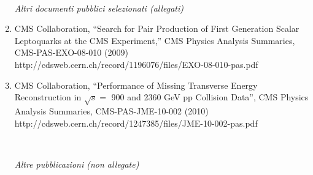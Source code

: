 \documentclass[10pt]{letter}
\begin{document}
\begin{enumerate}
~\\
\begin{center} \textit{Altri documenti pubblici selezionati (allegati)} \\ \end{center}

\item CMS Collaboration, 
  ``Search for Pair Production of First Generation Scalar Leptoquarks at the CMS Experiment,''
  CMS Physics Analysis Summaries, CMS-PAS-EXO-08-010 (2009) \\
  http://cdsweb.cern.ch/record/1196076/files/EXO-08-010-pas.pdf 

\item CMS Collaboration,
  ``Performance of Missing Transverse Energy Reconstruction in $\sqrt{s}=$ 900 and 2360 GeV pp Collision Data'',
  CMS Physics Analysis Summaries, CMS-PAS-JME-10-002 (2010) \\
  http://cdsweb.cern.ch/record/1247385/files/JME-10-002-pas.pdf

~\\
\begin{center} \textit{Altre pubblicazioni (non allegate)} \\ \end{center}


\end{enumerate}
\end{document}
